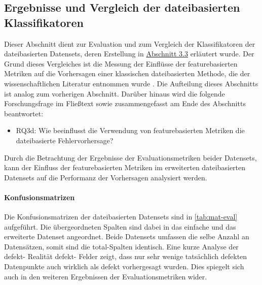 
\subsection{Ergebnisse und Vergleich der dateibasierten Klassifikatoren}
\label{classic-eval}

Dieser Abschnitt dient zur Evaluation und zum Vergleich der Klassifikatoren der dateibasierten Datensets, deren Erstellung in \hyperref[new-datasets]{Abschnitt 3.3} erläutert wurde. Der Grund dieses Vergleiches ist die Messung der Einflüsse der featurebasierten Metriken auf die Vorhersagen einer klassischen dateibasierten Methode, die der wissenschaftlichen Literatur entnommen wurde \cite{Moser2008}. Die Aufteilung dieses Abschnitts ist analog zum vorherigen Abschnitt. Darüber hinaus wird die folgende Forschungsfrage im Fließtext sowie zusammengefasst am Ende des Abschnitts beantwortet:
\vspace{-\topsep}
\begin{itemize}
\setlength{\itemsep}{-2pt}
 \item RQ3d: Wie beeinflusst die Verwendung von featurebasierten Metriken die dateibasierte Fehlervorhersage?
\end{itemize} 

Durch die Betrachtung der Ergebnisse der Evaluationsmetriken beider Datensets, kann der Einfluss der featurebasierten Metriken im erweiterten dateibasierten Datensets auf die Performanz der Vorhersagen analysiert werden. 

\paragraph{Konfusionsmatrizen}
Die Konfusionsmatrizen der dateibasierten Datensets sind in \autoref{tab:mat-eval} aufgeführt. Die übergeordneten Spalten sind dabei in das \glqq einfache\grqq{} und das erweiterte Datenset angeordnet. Beide Datensets umfassen die selbe Anzahl an Datensätzen, somit sind die \glqq total\grqq -Spalten identisch.
Eine kurze Analyse der \glqq defekt\grqq - \glqq Realität defekt\grqq - Felder zeigt, dass nur sehr wenige tatsächlich defekten Datenpunkte auch wirklich als defekt vorhergesagt wurden. Dies spiegelt sich auch in den weiteren Ergebnissen der Evaluationsmetriken wider.

